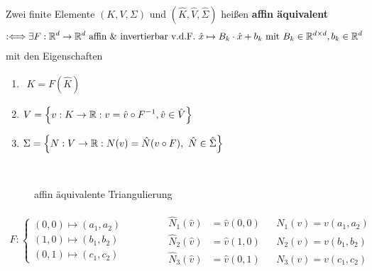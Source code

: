 \begin{definition}\enter %
	Zwei finite Elemente $(K,V,\Sigma)$ und $(\hat{K},\hat{V},\hat{\Sigma})$ heißen \textbf{affin äquivalent}
	\begin{align*}
		:\Longleftrightarrow\exists F:\mathbb{R}^d\to\mathbb{R}^d\text{ affin \& invertierbar v.d.F. }
		\hat{x}\mapsto B_k\cdot\hat{x}+b_k\text{ mit } B_k\in\mathbb{R}^{d\times d},b_k\in\mathbb{R}^d
	\end{align*}
	mit den Eigenschaften
	\begin{enumerate}[label=(\arabic*)]
		\item $\begin{aligned}
			K=F(\hat{K})
		\end{aligned}$
		\item $\begin{aligned}
			V=\Big\lbrace v: K\to\mathbb{R}:v=\hat{v}\circ F^{-1},\hat{v}\in\hat{V}\Big\rbrace
		\end{aligned}$
		\item $\begin{aligned}
			\Sigma=\Big\lbrace N:V\to\mathbb{R}:N(v)=\hat{N}(v\circ F),~\hat{N}\in\hat{\Sigma}\Big\rbrace
		\end{aligned}$
	\end{enumerate}
\end{definition}

\begin{beisp}\
	\begin{figure}[!ht]
		\begin{center}
			
			\caption{affin äquivalente Triangulierung}
			\label{AbbAffinEquivTriang}
		\end{center}
	\end{figure}

	\begin{align*}
		F:\left\lbrace\begin{array}{l}
			(0,0)\mapsto(a_1,a_2)\\
			(1,0)\mapsto(b_1,b_2)\\
			(0,1)\mapsto(c_1,c_2)
		\end{array}\right.
		\qquad\qquad
		\begin{matrix}
			\hat{N}_1(\hat{v})&=\hat{v}(0,0) &&N_1(v)=v(a_1,a_2)\\
			\hat{N}_2(\hat{v})&=\hat{v}(1,0) &&N_2(v)=v(b_1,b_2)\\
			\hat{N}_3(\hat{v})&=\hat{v}(0,1) &&N_3(v)=v(c_1,c_2)
		\end{matrix}
	\end{align*}
\end{beisp}

